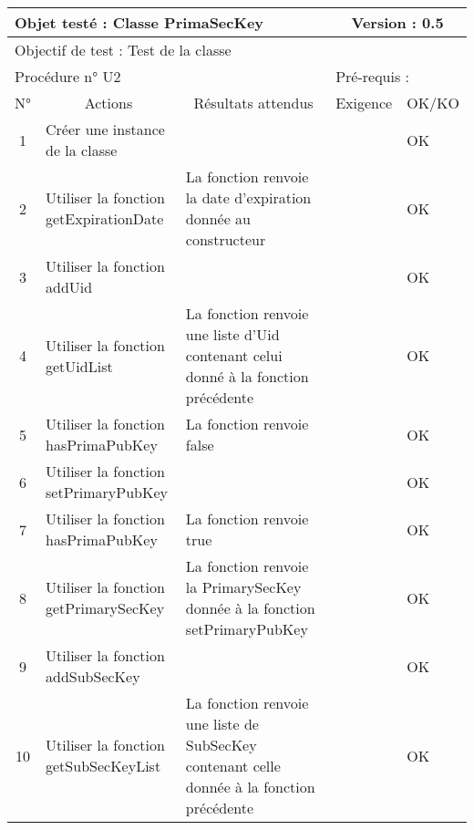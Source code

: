 \documentclass{../res/univ-projet}
\begin{document}
\begin{center}
    \begin{tabular}{|c|p{5cm}|p{5cm}|p{1.5cm}|p{1.5cm}|}
      \hline
      \multicolumn{3}{|l|}{Objet testé : Classe PrimaSecKey} & \multicolumn{2}{c|}{Version : 0.5}\\ \hline
      \multicolumn{5}{|l|}{Objectif de test : Test de la classe}\\ \hline
      \multicolumn{3}{|l|}{Procédure n° U2} & \multicolumn{2}{p{3cm}|}{Pré-requis : }\\ \hline
      \multicolumn{1}{|c|}{N°} & \multicolumn{1}{c|}{Actions} & \multicolumn{1}{c|}{Résultats attendus} & 
      \multicolumn{1}{c|}{Exigence} & \multicolumn{1}{c|}{OK/KO}\\ \hline
      1 & Créer une instance de la classe &  &  & OK \\
      2 & Utiliser la fonction getExpirationDate & La fonction renvoie la date d'expiration donnée au constructeur &  & OK\\
      3 & Utiliser la fonction addUid &  &  & OK\\
      4 & Utiliser la fonction getUidList & La fonction renvoie une liste d'Uid contenant celui donné à la fonction précédente &  & OK\\
      5 & Utiliser la fonction hasPrimaPubKey & La fonction renvoie false &  & OK\\
      6 & Utiliser la fonction setPrimaryPubKey &  &  & OK\\
      7 & Utiliser la fonction hasPrimaPubKey & La fonction renvoie true &  & OK\\
      8 & Utiliser la fonction getPrimarySecKey & La fonction renvoie la PrimarySecKey donnée à la fonction setPrimaryPubKey &  & OK\\
      9 & Utiliser la fonction addSubSecKey &  &  & OK\\
      10 & Utiliser la fonction getSubSecKeyList & La fonction renvoie une liste de SubSecKey contenant celle donnée à la fonction précédente &  & OK\\
	\hline
    \end{tabular}
    \vskip 2.2cm
    

\end{center}
\end{document}
